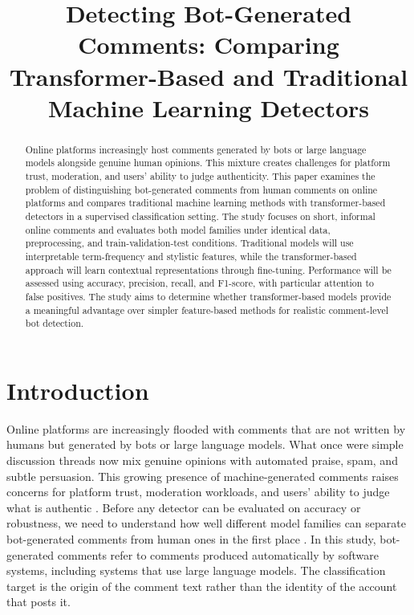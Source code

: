 \documentclass[conference]{IEEEtran}
\begin{document}
\title{Detecting Bot-Generated Comments: Comparing Transformer-Based and Traditional Machine Learning Detectors}

\author{
}

\maketitle

\begin{abstract}
    Online platforms increasingly host comments generated by bots or large language models alongside genuine human opinions. This mixture creates challenges for platform trust, moderation, and users' ability to judge authenticity. This paper examines the problem of distinguishing bot-generated comments from human comments on online platforms and compares traditional machine learning methods with transformer-based detectors in a supervised classification setting. The study focuses on short, informal online comments and evaluates both model families under identical data, preprocessing, and train-validation-test conditions. Traditional models will use interpretable term-frequency and stylistic features, while the transformer-based approach will learn contextual representations through fine-tuning. Performance will be assessed using accuracy, precision, recall, and F1-score, with particular attention to false positives. The study aims to determine whether transformer-based models provide a meaningful advantage over simpler feature-based methods for realistic comment-level bot detection.
\end{abstract}

\section{Introduction}

Online platforms are increasingly flooded with comments that are not written by humans but generated by bots or large language models.
What once were simple discussion threads now mix genuine opinions with automated praise, spam, and subtle persuasion.
This growing presence of machine-generated comments raises concerns for platform trust, moderation workloads, and users’ ability to judge what is authentic \cite{zaitsu_can_2024,li_mage_2024}.
Before any detector can be evaluated on accuracy or robustness, we need to understand how well different model families can separate bot-generated comments from human ones in the first place \cite{kumar_m_scalar_2024,ahmad_human_2026}.
In this study, bot-generated comments refer to comments produced automatically by software systems, including systems that use large language models. The classification target is the origin of the comment text rather than the identity of the account that posts it.
\end{document}
